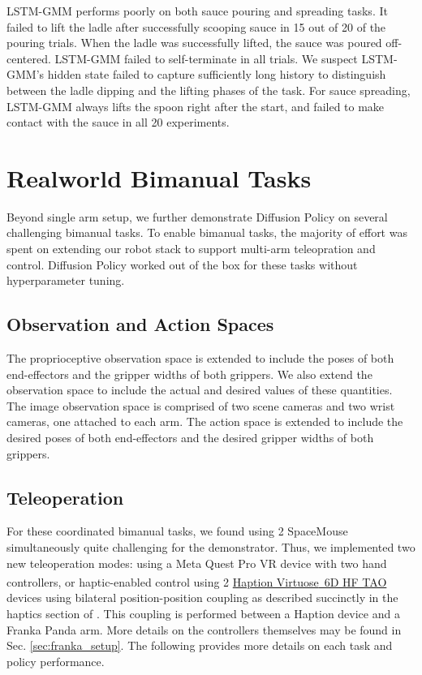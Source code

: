 \documentclass[Afour,sageh,times]{sagej}
\newcommand{\legalTM}{\textsuperscript{\texttrademark}}
\begin{document}
LSTM-GMM performs poorly on both sauce pouring and spreading tasks. It failed to lift the ladle after successfully scooping sauce in 15 out of 20 of the pouring trials. When the ladle was successfully lifted, the sauce was poured off-centered. LSTM-GMM failed to self-terminate in all trials. We suspect LSTM-GMM's hidden state failed to capture sufficiently long history to distinguish between the ladle dipping and the lifting phases of the task. For sauce spreading, LSTM-GMM always lifts the spoon right after the start, and failed to make contact with the sauce in all 20 experiments. 
\section{Realworld Bimanual Tasks}
\label{sec:eval_bimanual}
Beyond single arm setup, we further demonstrate Diffusion Policy on several challenging bimanual tasks. To enable bimanual tasks, the majority of effort was spent on extending our robot stack to support multi-arm teleopration and control. Diffusion Policy worked out of the box for these tasks without hyperparameter tuning. 

\subsection{Observation and Action Spaces}
The proprioceptive observation space is extended to include the poses of both end-effectors and the gripper widths of both grippers. We also extend the observation space to include the actual and desired values of these quantities.
The image observation space is comprised of two scene cameras and two wrist cameras, one attached to each arm.
The action space is extended to include the desired poses of both end-effectors and the desired gripper widths of both grippers.

\subsection{Teleoperation}
For these coordinated bimanual tasks, we found using 2 SpaceMouse simultaneously quite challenging for the demonstrator. Thus, we implemented two new teleoperation modes:
using a Meta Quest Pro VR device with two hand controllers, or
haptic-enabled control using 2
\href{https://www.haption.com/en/products-en/virtuose-6d-tao-en.html\#fa-download-downloads}{
Haption Virtuose\legalTM\ 6D HF TAO}
devices using bilateral position-position coupling as described succinctly in the haptics section of \citet{siciliano2008springer}. This coupling is performed between a Haption device and a Franka Panda arm.
More details on the controllers themselves may be found in Sec. \ref{sec:franka_setup}.
The following provides more details on each task and policy performance.  
\end{document}
